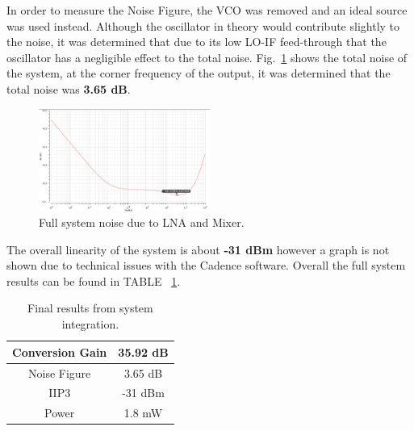 In order to measure the Noise Figure, the VCO was removed and an ideal source was used instead. Although the oscillator in theory would contribute slightly to the noise, it was determined that due to its low LO-IF feed-through that the oscillator has a negligible effect to the total noise. Fig.~\ref{fig:fullsystemnoise} shows the total noise of the system, at the corner frequency of the output, it was determined that the total noise was {\bf 3.65 dB}.

\begin{figure}[H]
   \centering
    \includegraphics[width=0.5\textwidth]{figures/FullSysNoiseFigure.png}
    \caption{Full system noise due to LNA and Mixer.}
    \label{fig:fullsystemnoise}
\end{figure}

The overall linearity of the system is about {\bf -31 dBm} however a graph is not shown due to technical issues with the Cadence software. Overall the full system results can be found in TABLE ~\ref{tab:systemresults}.


\begin{table}[h]
\begin{center}
	\begin{tabular}{ c | c  }

  		Conversion Gain & 35.92 dB \\ \hline
  		Noise Figure & 3.65 dB \\ \hline
  		IIP3 & -31 dBm\\ \hline
		Power & 1.8 mW \\

	\end{tabular}

\end{center}
\caption{Final results from system integration.}
\label{tab:systemresults}
\end{table}
